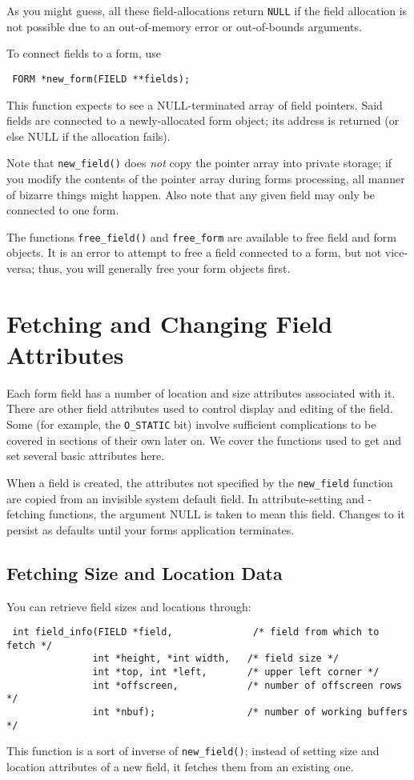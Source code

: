 As you might guess, all these field-allocations return \texttt{NULL} if
the field allocation is not possible due to an out-of-memory error or
out-of-bounds arguments. 

To connect fields to a form, use
\begin{verbatim} FORM *new_form(FIELD **fields);
\end{verbatim}
This function expects to see a NULL-terminated array of field pointers.
Said fields are connected to a newly-allocated form object; its address
is returned (or else NULL if the allocation fails).   

Note that \texttt{new\_field()} does \emph{not} copy the pointer array
into private storage; if you modify the contents of the pointer array
during forms processing, all manner of bizarre things might happen.  Also
note that any given field may only be connected to one form. 

The functions \texttt{free\_field()} and \texttt{free\_form} are available
to free field and form objects.  It is an error to attempt to free a field
connected to a form, but not vice-versa; thus, you will generally free
your form objects first.

\section{Fetching and Changing Field Attributes}

\label{f0:fattributes}Each form field has a number of location and size attributes
associated with it. There are other field attributes used to control
display and editing of the field.  Some (for example, the \texttt{O\_STATIC} bit)
involve sufficient complications to be covered in sections of their own
later on.  We cover the functions used to get and set several basic
attributes here. 

When a field is created, the attributes not specified by the
\texttt{new\_field} function are copied from an invisible system
default field.  In attribute-setting and -fetching functions, the
argument NULL is taken to mean this field.  Changes to it persist
as defaults until your forms application terminates.

\subsection{Fetching Size and Location Data}

\label{f0:fsizes}You can retrieve field sizes and locations through:
\begin{verbatim} int field_info(FIELD *field,              /* field from which to fetch */
               int *height, *int width,   /* field size */
               int *top, int *left,       /* upper left corner */
               int *offscreen,            /* number of offscreen rows */
               int *nbuf);                /* number of working buffers */
\end{verbatim}
This function is a sort of inverse of \texttt{new\_field()}; instead of
setting size and location attributes of a new field, it fetches them
from an existing one.

